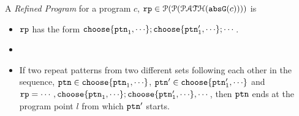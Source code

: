 \begin{defn}
  A \emph{Refined Program} for a program $c$, $\mathtt{rp} \in \mathcal{P}(\mathcal{P}(\mathcal{PATH}(\mathtt{abs}{\mathtt{G}}(c))))$
  is 
  \begin{itemize}
    \item $\mathtt{rp}$ has the form $\rpchoose{\rpattern_1, \cdots }; \rpchoose{\rpattern'_1, \cdots }; \cdots$.
  \item 
  \item 
  If two repeat patterns from two different sets following each other in the sequence,
  $\rpattern \in \rpchoose{\rpattern_1, \cdots}$, $\rpattern' \in \rpchoose{\rpattern_1', \cdots}$ and
  $\rprog = \cdots, \rpchoose{\rpattern_1, \cdots}; \rpchoose{\rpattern_1', \cdots}, \cdots$,
  then $\mathtt{ptn}$ ends at the program point $l$ from which $\mathtt{ptn}'$ starts.
  \end{itemize}
\end{defn}
